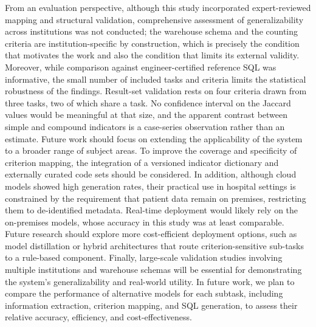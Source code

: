 \documentclass[applsci,article,submit,pdftex,oneauthor]{Definitions/mdpi}
\begin{document}
From an evaluation perspective, although this study incorporated expert-reviewed mapping and structural validation, comprehensive assessment of generalizability across institutions was not conducted; the warehouse schema and the counting criteria
are institution-specific by construction, which is precisely the condition that
motivates the work and also the condition that limits its external validity.
Moreover, while comparison against engineer-certified reference SQL was informative, the small number of included tasks and criteria limits the statistical robustness of the findings. Result-set validation rests on four criteria drawn from three tasks, two of which share a task. No confidence interval on the Jaccard values would be meaningful at that size, and the apparent contrast between simple and compound indicators is a case-series observation rather than an estimate. Future work should focus on extending
the applicability of the system to a broader range of subject areas. To improve
the coverage and specificity of criterion mapping, the integration of a
versioned indicator dictionary and externally curated code sets should be
considered. In addition, although cloud models showed high generation rates,
their practical use in hospital settings is constrained by the requirement that
patient data remain on premises, restricting them to de-identified metadata.
Real-time deployment would likely rely on the on-premises models, whose accuracy
in this study was at least comparable. Future research should explore more
cost-efficient deployment options, such as model distillation or hybrid
architectures that route criterion-sensitive sub-tasks to a rule-based
component. Finally, large-scale validation studies involving multiple
institutions and warehouse schemas will be essential for demonstrating the
system's generalizability and real-world utility. In future work, we plan to
compare the performance of alternative models for each subtask, including
information extraction, criterion mapping, and SQL generation, to assess their
relative accuracy, efficiency, and cost-effectiveness.
\end{document}
